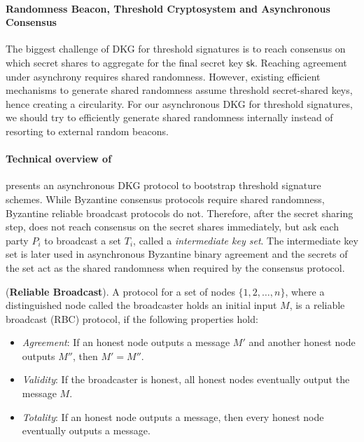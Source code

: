 \paragraph{Randomness Beacon, Threshold Cryptosystem and Asynchronous Consensus} The biggest challenge of DKG for threshold signatures is to reach consensus on which secret shares to aggregate for the final secret key $\mathsf{sk}$. Reaching agreement under asynchrony requires shared randomness. However, existing efficient mechanisms to generate shared randomness assume threshold secret-shared keys, hence creating a circularity. For our asynchronous DKG for threshold signatures, we should try to efficiently generate shared randomness internally instead of resorting to external random beacons. 

\paragraph{Technical overview of \cite{DBLP:conf/sp/DasYXMK022}} \cite{DBLP:conf/sp/DasYXMK022} presents an asynchronous DKG protocol to bootstrap threshold signature schemes. While Byzantine consensus protocols require shared randomness, Byzantine reliable broadcast protocols do not. Therefore, after the secret sharing step, \cite{DBLP:conf/sp/DasYXMK022} does not reach consensus on the secret shares immediately, but ask each party $P_i$ to broadcast a set $T_i$, called a \textit{intermediate key set}. The intermediate key set is later used in asynchronous Byzantine binary agreement and the secrets of the set act as the shared randomness when required by the consensus protocol. 

\begin{definition} (\textbf{Reliable Broadcast}). A protocol for a set of nodes $\{1,2,\dots, n\}$, where a distinguished node called the broadcaster holds an initial input $M$, is a reliable broadcast (RBC) protocol, if the following properties hold:
    \begin{itemize}
        \item \textit{Agreement}: If an honest node outputs a message $M'$ and another honest node outputs $M''$, then $M'=M''$. 
        \item \textit{Validity}: If the broadcaster is honest, all honest nodes eventually output the message $M$. 
        \item \textit{Totality}: If an honest node outputs a message, then every honest node eventually outputs a message.  
    \end{itemize}
\end{definition}

